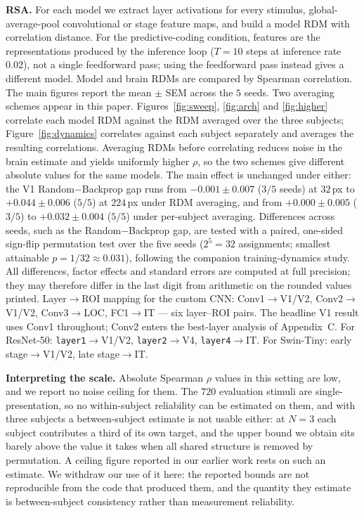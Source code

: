 \documentclass[10pt,twocolumn]{article}
\begin{document}
\textbf{RSA.} For each model we extract layer activations for every stimulus, global-average-pool convolutional or stage feature maps, and build a model RDM with correlation distance. For the predictive-coding condition, features are the representations produced by the inference loop ($T=10$ steps at inference rate $0.02$), not a single feedforward pass; using the feedforward pass instead gives a different model. Model and brain RDMs are compared by Spearman correlation. The main figures report the mean $\pm$ SEM across the $5$ seeds. Two averaging schemes appear in this paper. Figures~\ref{fig:sweep}, \ref{fig:arch} and \ref{fig:higher} correlate each model RDM against the RDM averaged over the three subjects; Figure~\ref{fig:dynamics} correlates against each subject separately and averages the resulting correlations. Averaging RDMs before correlating reduces noise in the brain estimate and yields uniformly higher $\rho$, so the two schemes give different absolute values for the same models. The main effect is unchanged under either: the V1 Random$-$Backprop gap runs from $-0.001 \pm 0.007$ ($3/5$ seeds) at $32$\,px to $+0.044 \pm 0.006$ ($5/5$) at $224$\,px under RDM averaging, and from $+0.000 \pm 0.005$ ($3/5$) to $+0.032 \pm 0.004$ ($5/5$) under per-subject averaging. Differences across seeds, such as the Random$-$Backprop gap, are tested with a paired, one-sided sign-flip permutation test over the five seeds ($2^5=32$ assignments; smallest attainable $p = 1/32 \approx 0.031$), following the companion training-dynamics study. All differences, factor effects and standard errors are computed at full precision; they may therefore differ in the last digit from arithmetic on the rounded values printed. Layer$\to$ROI mapping for the custom CNN: Conv1$\to$V1/V2, Conv2$\to$V1/V2, Conv3$\to$LOC, FC1$\to$IT --- six layer--ROI pairs. The headline V1 result uses Conv1 throughout; Conv2 enters the best-layer analysis of Appendix~C. For ResNet-50: \texttt{layer1}$\to$V1/V2, \texttt{layer2}$\to$V4, \texttt{layer4}$\to$IT. For Swin-Tiny: early stage$\to$V1/V2, late stage$\to$IT.

\textbf{Interpreting the scale.} Absolute Spearman $\rho$ values in this setting are low, and we report no noise ceiling for them. The $720$ evaluation stimuli are single-presentation, so no within-subject reliability can be estimated on them, and with three subjects a between-subject estimate is not usable either: at $N=3$ each subject contributes a third of its own target, and the upper bound we obtain sits barely above the value it takes when all shared structure is removed by permutation. A ceiling figure reported in our earlier work \citep{leutenegger2026} rests on such an estimate. We withdraw our use of it here: the reported bounds are not reproducible from the code that produced them, and the quantity they estimate is between-subject consistency rather than measurement reliability.
\end{document}
